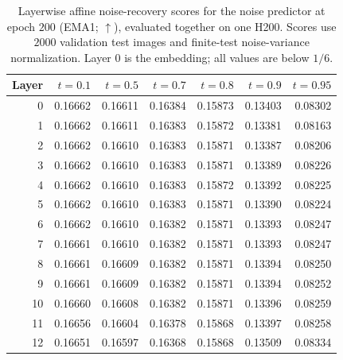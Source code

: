 \begin{table}[H]
\centering
\caption{Layerwise affine noise-recovery scores for the noise predictor at epoch $200$ (EMA1; $\uparrow$), evaluated together on one H200. Scores use $2000$ validation test images and finite-test noise-variance normalization. Layer $0$ is the embedding; all values are below $1/6$.}
\label{tab:exp-probe-200-predeps}
\small
\begin{tabular}{rrrrrrr}
\toprule
Layer & $t=0.1$ & $t=0.5$ & $t=0.7$ & $t=0.8$ & $t=0.9$ & $t=0.95$\\
\midrule
0 & 0.16662 & 0.16611 & 0.16384 & 0.15873 & 0.13403 & 0.08302\\
1 & 0.16662 & 0.16611 & 0.16383 & 0.15872 & 0.13381 & 0.08163\\
2 & 0.16662 & 0.16610 & 0.16383 & 0.15871 & 0.13387 & 0.08206\\
3 & 0.16662 & 0.16610 & 0.16383 & 0.15871 & 0.13389 & 0.08226\\
4 & 0.16662 & 0.16610 & 0.16383 & 0.15872 & 0.13392 & 0.08225\\
5 & 0.16662 & 0.16610 & 0.16383 & 0.15871 & 0.13390 & 0.08224\\
6 & 0.16662 & 0.16610 & 0.16382 & 0.15871 & 0.13393 & 0.08247\\
7 & 0.16661 & 0.16610 & 0.16382 & 0.15871 & 0.13393 & 0.08247\\
8 & 0.16661 & 0.16609 & 0.16382 & 0.15871 & 0.13394 & 0.08250\\
9 & 0.16661 & 0.16609 & 0.16382 & 0.15871 & 0.13394 & 0.08252\\
10 & 0.16660 & 0.16608 & 0.16382 & 0.15871 & 0.13396 & 0.08259\\
11 & 0.16656 & 0.16604 & 0.16378 & 0.15868 & 0.13397 & 0.08258\\
12 & 0.16651 & 0.16597 & 0.16368 & 0.15868 & 0.13509 & 0.08334\\
\bottomrule
\end{tabular}
\end{table}
